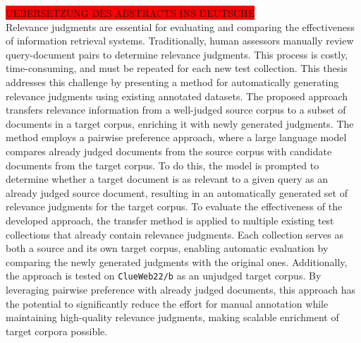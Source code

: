 \colorbox{red}{UEBERSETZUNG DES ABSTRACTS INS DEUTSCHE}\\
Relevance judgments are essential for evaluating and comparing the effectiveness of information retrieval systems. Traditionally, human assessors manually review query-document pairs to determine relevance judgments. This process is costly, time-consuming, and must be repeated for each new test collection. This thesis addresses this challenge by presenting a method for automatically generating relevance judgments using existing annotated datasets. The proposed approach transfers relevance information from a well-judged source corpus to a subset of documents in a target corpus, enriching it with newly generated judgments. The method employs a pairwise preference approach, where a large language model compares already judged documents from the source corpus with candidate documents from the target corpus. To do this, the model is prompted to determine whether a target document is as relevant to a given query as an already judged source document, resulting in an automatically generated set of relevance judgments for the target corpus. To evaluate the effectiveness of the developed approach, the transfer method is applied to multiple existing test collections that already contain relevance judgments. Each collection serves as both a source and its own target corpus, enabling automatic evaluation by comparing the newly generated judgments with the original ones. Additionally, the approach is tested on \texttt{ClueWeb22/b} as an unjudged target corpus. By leveraging pairwise preference with already judged documents, this approach has the potential to significantly reduce the effort for manual annotation while maintaining high-quality relevance judgments, making scalable enrichment of target corpora possible.